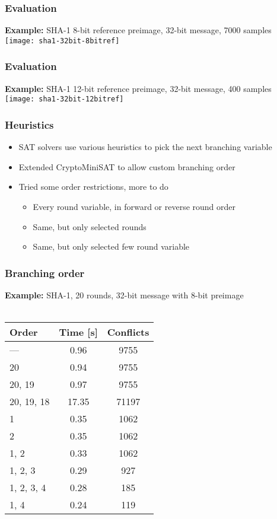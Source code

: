 \documentclass{beamer}
\begin{document}
\begin{frame}
\frametitle{Evaluation}
\textbf{Example:} SHA-1 8-bit reference preimage, 32-bit message, 7000 samples
\texttt{[image: sha1-32bit-8bitref]}
\end{frame}

\begin{frame}
\frametitle{Evaluation}
\textbf{Example:} SHA-1 12-bit reference preimage, 32-bit message, 400 samples
\texttt{[image: sha1-32bit-12bitref]}
\end{frame}

\begin{frame}
\frametitle{Heuristics}
\begin{itemize}
\item SAT solvers use various heuristics to pick the next branching variable
\item Extended CryptoMiniSAT to allow custom branching order
\item Tried some order restrictions, more to do
\begin{itemize}
\item Every round variable, in forward or reverse round order
\item Same, but only selected rounds
\item Same, but only selected few round variable
\end{itemize}
\end{itemize}
\end{frame}

\begin{frame}
\frametitle{Branching order}
\textbf{Example:} SHA-1, 20 rounds, 32-bit message with 8-bit preimage\\~\\
\begin{center}
\begin{tabular}{l|c|c}
Order & Time [s] & Conflicts \\ \hline
--- & 0.96 & 9755 \\ \hline
20 & 0.94 & 9755 \\
20, 19 & 0.97 & 9755 \\
20, 19, 18 & 17.35 & 71197 \\ \hline
1 & 0.35 & 1062 \\
2 & 0.35 & 1062 \\
1, 2 & 0.33 & 1062 \\
1, 2, 3 & 0.29 & 927 \\
1, 2, 3, 4 & 0.28 & 185 \\
1, 4 & 0.24 & 119
\end{tabular}
\end{center}
\end{frame}
\end{document}
